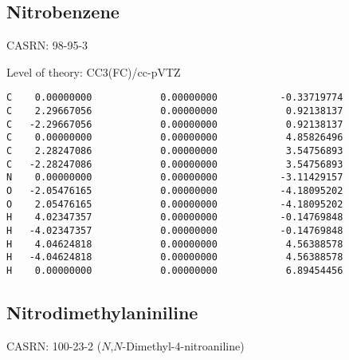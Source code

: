 \documentclass[journal=jctcce,manuscript=article,layout=traditional]{achemso}
\newcommand{\TZ}{cc-pVTZ}
\begin{document}
\subsection{Nitrobenzene}

CASRN: 98-95-3

\begin{singlespace}
\noindent   Level of theory: CC3(FC)/{\TZ}
\begin{verbatim}
C    0.00000000            0.00000000           -0.33719774
C    2.29667056            0.00000000            0.92138137
C   -2.29667056            0.00000000            0.92138137
C    0.00000000            0.00000000            4.85826496
C    2.28247086            0.00000000            3.54756893
C   -2.28247086            0.00000000            3.54756893
N    0.00000000            0.00000000           -3.11429157
O   -2.05476165            0.00000000           -4.18095202
O    2.05476165            0.00000000           -4.18095202
H    4.02347357            0.00000000           -0.14769848
H   -4.02347357            0.00000000           -0.14769848
H    4.04624818            0.00000000            4.56388578
H   -4.04624818            0.00000000            4.56388578
H    0.00000000            0.00000000            6.89454456
\end{verbatim}
\end{singlespace}

\subsection{Nitrodimethylaniniline}

CASRN: 100-23-2 ($N$,$N$-Dimethyl-4-nitroaniline)
\end{document}
